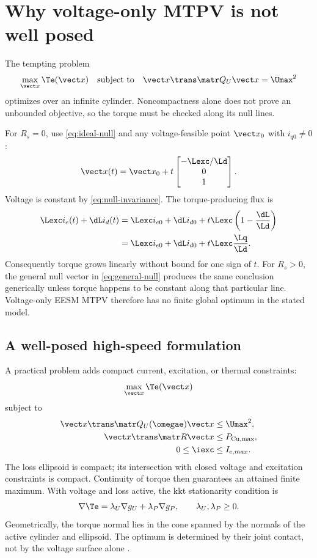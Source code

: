 \section{Why voltage-only MTPV is not well posed}

The tempting problem
\begin{equation}
 \max_{\state}\Te(\state)
 \quad\text{subject to}\quad
 \state\trans\Qu\state=\Umax^2\label{eq:naive-mtpv}
\end{equation}
optimizes over an infinite cylinder.  Noncompactness alone does not prove an
unbounded objective, so the torque must be checked along its null lines.

For $R_s=0$, use \cref{eq:ideal-null} and any voltage-feasible point
$\state_0$ with $i_{q0}\neq0$:
\begin{equation}
 \state(t)=\state_0+t
 \begin{bmatrix}-\Lexc/\Ld\\0\\1\end{bmatrix}.
\end{equation}
Voltage is constant by \cref{eq:null-invariance}.  The torque-producing flux is
\begin{align}
\Lexc i_e(t)+\dL i_d(t)
 &=\Lexc i_{e0}+\dL i_{d0}
 +t\Lexc\left(1-\frac{\dL}{\Ld}\right)\\
 &=\Lexc i_{e0}+\dL i_{d0}
 +t\Lexc\frac{\Lq}{\Ld}.
\end{align}
Consequently torque grows linearly without bound for one sign of $t$.  For
$R_s>0$, the general null vector in \cref{eq:general-null} produces the same
conclusion generically unless torque happens to be constant along that
particular line.  Voltage-only EESM MTPV therefore has no finite global optimum
in the stated model.

\subsection{A well-posed high-speed formulation}

A practical problem adds compact current, excitation, or thermal constraints:
\begin{equation}
 \max_{\state}\Te(\state)
\end{equation}
subject to
\begin{align}
 \state\trans\Qu(\omegae)\state&\leq\Umax^2,\\
 \state\trans\Rl\state&\leq\Pmax,\\
 0\leq\iexc&\leq I_{\mathrm e,max}.
\end{align}
The loss ellipsoid is compact; its intersection with closed voltage and
excitation constraints is compact.  Continuity of torque then guarantees an
attained finite maximum.  With voltage and loss active, the \gls{kkt}
stationarity condition is
\begin{equation}
 \nabla\Te=\lambda_U\nabla g_U+\lambda_P\nabla g_P,
 \qquad \lambda_U,\lambda_P\geq0.\label{eq:eesm-kkt}
\end{equation}
Geometrically, the torque normal lies in the cone spanned by the normals of the
active cylinder and ellipsoid.  The optimum is determined by their joint
contact, not by the voltage surface alone \cite{boyd2004}.

